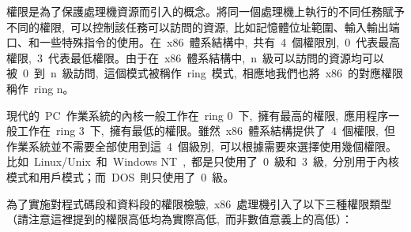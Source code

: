 
權限是為了保護處理機資源而引入的概念。將同一個處理機上執行的不同任務賦予不同的權限,~可以控制該任務可以訪問的資源,~比如記憶體位址範圍、輸入輸出端口、和一些特殊指令的使用。在~x86~體系結構中,~共有~4~個權限別,~0~代表最高權限,~3~代表最低權限。由于在~x86~體系結構中,~n~級可以訪問的資源均可以被~0~到~n~級訪問,~這個模式被稱作~ring~模式,~相應地我們也將~x86~的對應權限稱作~ring n。

現代的~PC~作業系統的內核一般工作在~ring 0~下,~擁有最高的權限,~應用程序一般工作在~ring 3~下,~擁有最低的權限。雖然~x86~體系結構提供了~4~個權限,~但作業系統並不需要全部使用到這~4~個級別,~可以根據需要來選擇使用幾個權限。比如~Linux/Unix~和~Windows NT~,~都是只使用了~0~級和~3~級,~分別用于內核模式和用戶模式；而~DOS~則只使用了~0~級。

為了實施對程式碼段和資料段的權限檢驗,~x86~處理機引入了以下三種權限類型（請注意這裡提到的權限高低均為實際高低,~而非數值意義上的高低）：

